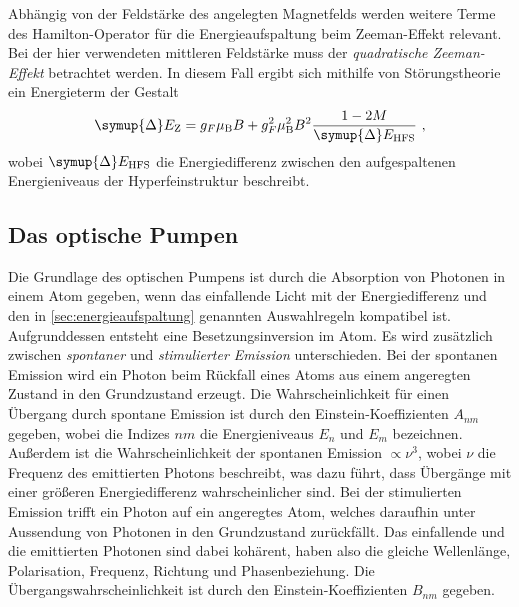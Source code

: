     Abhängig von der Feldstärke des angelegten Magnetfelds werden weitere Terme des Hamilton-Operator für die Energieaufspaltung beim Zeeman-Effekt relevant.
    Bei der hier verwendeten mittleren Feldstärke muss der \textit{quadratische Zeeman-Effekt} betrachtet werden.
    In diesem Fall ergibt sich mithilfe von Störungstheorie ein Energieterm der Gestalt
    \begin{equation}
        \symup{\Delta}E_\text{Z} = g_F \mu_\text{B} B + g^2_F \mu^2_\text{B} B^2 \frac{1 - 2M}{\symup{\Delta}E_\text{HFS}} \ ,
        \label{eqn:quadr_zeeman}
    \end{equation}
    wobei $\symup{\Delta}E_\text{HFS}$ die Energiedifferenz zwischen den aufgespaltenen Energieniveaus der Hyperfeinstruktur beschreibt.


\subsection{Das optische Pumpen}
\label{sec:theorie:optisches_pumpen}

    Die Grundlage des optischen Pumpens ist durch die Absorption von Photonen in einem Atom gegeben,
    wenn das einfallende Licht mit der Energiedifferenz und den in \autoref{sec:energieaufspaltung} genannten Auswahlregeln kompatibel ist.
    Aufgrunddessen entsteht eine Besetzungsinversion im Atom.
    Es wird zusätzlich zwischen \textit{spontaner} und \textit{stimulierter Emission} unterschieden.
    Bei der spontanen Emission wird ein Photon beim Rückfall eines Atoms aus einem angeregten Zustand in den Grundzustand erzeugt.
    Die Wahrscheinlichkeit für einen Übergang durch spontane Emission ist durch den Einstein-Koeffizienten $A_{nm}$ gegeben,
    wobei die Indizes $nm$ die Energieniveaus $E_n$ und $E_m$ bezeichnen.
    Außerdem ist die Wahrscheinlichkeit der spontanen Emission $\propto \nu^3$,
    wobei $\nu$ die Frequenz des emittierten Photons beschreibt,
    was dazu führt,
    dass Übergänge mit einer größeren Energiedifferenz wahrscheinlicher sind.
    Bei der stimulierten Emission trifft ein Photon auf ein angeregtes Atom,
    welches daraufhin unter Aussendung von Photonen in den Grundzustand zurückfällt.
    Das einfallende und die emittierten Photonen sind dabei kohärent,
    haben also die gleiche Wellenlänge, Polarisation, Frequenz, Richtung und Phasenbeziehung.
    Die Übergangswahrscheinlichkeit ist durch den Einstein-Koeffizienten $B_{nm}$ gegeben.

